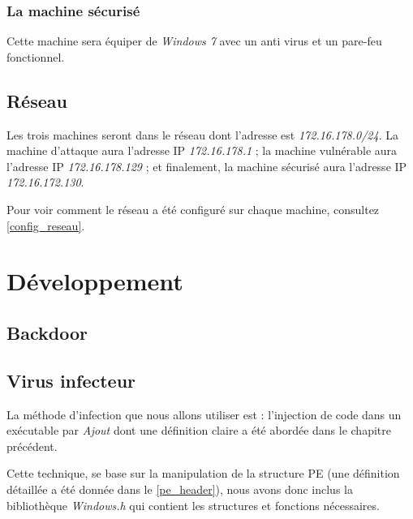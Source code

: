     \subsubsection{La machine sécurisé} 
    Cette machine sera équiper de \emph{Windows 7} avec un anti virus et un pare-feu fonctionnel.

\subsection{Réseau}
    Les trois machines seront dans le réseau \cite{reseau} dont l'adresse est \emph{172.16.178.0/24}. 
    La machine d'attaque aura l'adresse IP \emph{172.16.178.1} ; la machine vulnérable aura l'adresse IP 
    \emph{172.16.178.129} ; et finalement, la machine sécurisé aura l'adresse IP \emph{172.16.172.130}.

    Pour voir comment le réseau a été configuré sur chaque machine, consultez \autoref{config_reseau}.


\section{Développement}
    \subsection{Backdoor}
    \subsection{Virus infecteur}
    La méthode d’infection que nous allons utiliser est : l’injection de code dans un exécutable par \emph{Ajout}
    dont une définition claire a été abordée dans le chapitre précédent.

    Cette technique, se base sur la manipulation de la structure PE (une définition détaillée a été donnée dans le 
    \autoref{pe_header}), nous avons donc inclus la bibliothèque \emph{Windows.h} qui contient les 
    structures et fonctions nécessaires.

